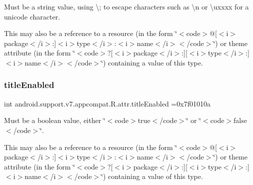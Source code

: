 Must be a string value, using \textquotesingle{}\textbackslash{};\textquotesingle{} to escape characters such as \textquotesingle{}\textbackslash{}n\textquotesingle{} or \textquotesingle{}\textbackslash{}uxxxx\textquotesingle{} for a unicode character. 

This may also be a reference to a resource (in the form \char`\"{}$<$code$>$@\mbox{[}$<$i$>$package$<$/i$>$\+:\mbox{]}$<$i$>$type$<$/i$>$\+:$<$i$>$name$<$/i$>$$<$/code$>$\char`\"{}) or theme attribute (in the form \char`\"{}$<$code$>$?\mbox{[}$<$i$>$package$<$/i$>$\+:\mbox{]}\mbox{[}$<$i$>$type$<$/i$>$\+:\mbox{]}$<$i$>$name$<$/i$>$$<$/code$>$\char`\"{}) containing a value of this type. \mbox{\label{classandroid_1_1support_1_1v7_1_1appcompat_1_1R_1_1attr_ae7b9611359d9bc4c48118853cd058182}} 
\subsubsection{\texorpdfstring{title\+Enabled}{titleEnabled}}
{\footnotesize\ttfamily int android.\+support.\+v7.\+appcompat.\+R.\+attr.\+title\+Enabled =0x7f01010a\hspace{0.3cm}{\ttfamily [static]}}

Must be a boolean value, either \char`\"{}$<$code$>$true$<$/code$>$\char`\"{} or \char`\"{}$<$code$>$false$<$/code$>$\char`\"{}. 

This may also be a reference to a resource (in the form \char`\"{}$<$code$>$@\mbox{[}$<$i$>$package$<$/i$>$\+:\mbox{]}$<$i$>$type$<$/i$>$\+:$<$i$>$name$<$/i$>$$<$/code$>$\char`\"{}) or theme attribute (in the form \char`\"{}$<$code$>$?\mbox{[}$<$i$>$package$<$/i$>$\+:\mbox{]}\mbox{[}$<$i$>$type$<$/i$>$\+:\mbox{]}$<$i$>$name$<$/i$>$$<$/code$>$\char`\"{}) containing a value of this type. \mbox{\label{classandroid_1_1support_1_1v7_1_1appcompat_1_1R_1_1attr_a04440642e436aae11b89705695772631}} 
